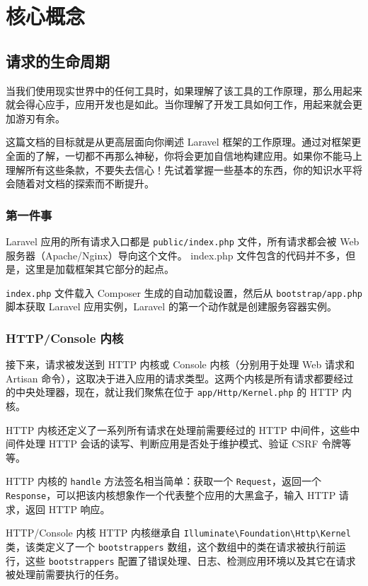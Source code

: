 \documentclass{progartcn}
\begin{document}
\section{核心概念}

\subsection{请求的生命周期}

当我们使用现实世界中的任何工具时，如果理解了该工具的工作原理，那么用起来就会得心应手，应用开发也是如此。当你理解了开发工具如何工作，用起来就会更加游刃有余。

这篇文档的目标就是从更高层面向你阐述 Laravel 框架的工作原理。通过对框架更全面的了解，一切都不再那么神秘，你将会更加自信地构建应用。如果你不能马上理解所有这些条款，不要失去信心！先试着掌握一些基本的东西，你的知识水平将会随着对文档的探索而不断提升。

\subsubsection{第一件事}

Laravel 应用的所有请求入口都是 \verb|public/index.php| 文件，所有请求都会被 Web 服务器（Apache/Nginx）导向这个文件。 index.php 文件包含的代码并不多，但是，这里是加载框架其它部分的起点。

\verb|index.php| 文件载入 Composer 生成的自动加载设置，然后从 \verb|bootstrap/app.php| 脚本获取 Laravel 应用实例，Laravel 的第一个动作就是创建服务容器实例。

\subsubsection{HTTP/Console 内核}

接下来，请求被发送到 HTTP 内核或 Console 内核（分别用于处理 Web 请求和 Artisan 命令），这取决于进入应用的请求类型。这两个内核是所有请求都要经过的中央处理器，现在，就让我们聚焦在位于 \verb|app/Http/Kernel.php| 的 HTTP 内核。

HTTP 内核还定义了一系列所有请求在处理前需要经过的 HTTP 中间件，这些中间件处理 HTTP 会话的读写、判断应用是否处于维护模式、验证 CSRF 令牌等等。

HTTP 内核的 \verb|handle| 方法签名相当简单：获取一个 \verb|Request|，返回一个 \verb|Response|，可以把该内核想象作一个代表整个应用的大黑盒子，输入 HTTP 请求，返回 HTTP 响应。

\begin{titledbox}{HTTP/Console 内核}
HTTP 内核继承自 \verb|Illuminate\Foundation\Http\Kernel| 类，该类定义了一个 \verb|bootstrappers| 数组，这个数组中的类在请求被执行前运行，这些 \verb|bootstrappers| 配置了错误处理、日志、检测应用环境以及其它在请求被处理前需要执行的任务。
\end{titledbox}
\end{document}
